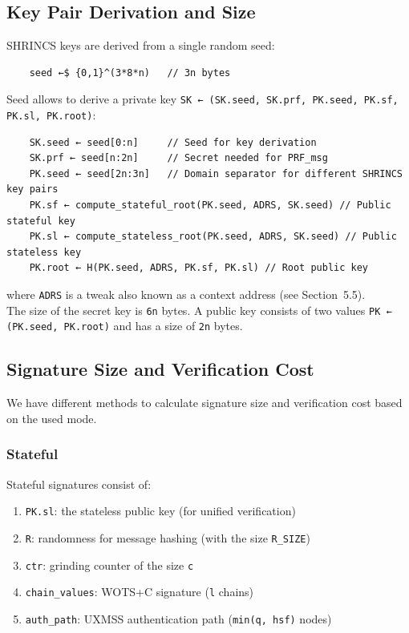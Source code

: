 \subsection{Key Pair Derivation and Size}
SHRINCS keys are derived from a single random seed:
\begin{verbatim}
    seed ←$ {0,1}^(3*8*n)   // 3n bytes
\end{verbatim}
Seed allows to derive a private key \texttt{SK ← (SK.seed, SK.prf, PK.seed, PK.sf, PK.sl, PK.root)}:
\begin{verbatim}
    SK.seed ← seed[0:n]     // Seed for key derivation
    SK.prf ← seed[n:2n]     // Secret needed for PRF_msg
    PK.seed ← seed[2n:3n]   // Domain separator for different SHRINCS key pairs
    PK.sf ← compute_stateful_root(PK.seed, ADRS, SK.seed) // Public stateful key
    PK.sl ← compute_stateless_root(PK.seed, ADRS, SK.seed) // Public stateless key
    PK.root ← H(PK.seed, ADRS, PK.sf, PK.sl) // Root public key
\end{verbatim}
where \texttt{ADRS} is a tweak also known as a context address (see Section~5.5). \\

The size of the secret key is \texttt{6n} bytes. A public key consists of two values \texttt{PK ← (PK.seed, PK.root)} and has a size of \texttt{2n} bytes.

\subsection{Signature Size and Verification Cost}
We have different methods to calculate signature size and verification cost based on the used mode. 
\subsubsection{Stateful}
Stateful signatures consist of:
\begin{enumerate}
    \item \texttt{PK.sl}: the stateless public key (for unified verification)
    \item \texttt{R}: randomness for message hashing (with the size \texttt{R\_SIZE})
    \item \texttt{ctr}: grinding counter of the size \texttt{c}
    \item \texttt{chain\_values}: WOTS+C signature (\texttt{l} chains)
    \item \texttt{auth\_path}: UXMSS authentication path (\texttt{min(q, hsf)} nodes)
\end{enumerate}

